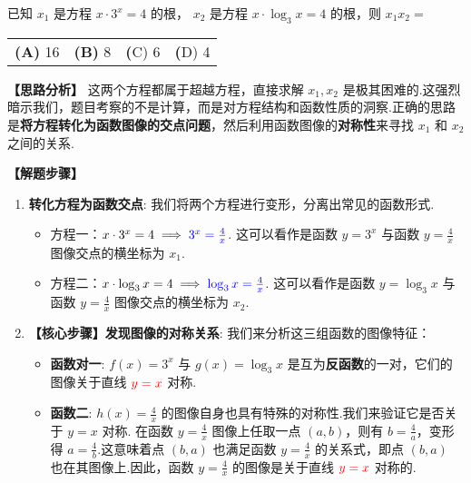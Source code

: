\begin{exercise}[利用对称性求解方程根的关系]
	已知 $x_1$ 是方程 $x \cdot 3^x = 4$ 的根， $x_2$ 是方程 $x \cdot \log_3 x = 4$ 的根，则 $x_1 x_2 =$
	
	\vspace{0.5em}
	\noindent 
	\begin{tabularx}{\linewidth}{*{4}{X}}
		\textbf{(A)} 16 & \textbf{(B)} 8 & \textbf(C) 6 & \textbf(D) 4
	\end{tabularx}
	
\end{exercise}
\begin{solution}
	\textbf{【思路分析】}
	\textcolor{green!50!black}{这两个方程都属于超越方程，直接求解 $x_1, x_2$ 是极其困难的.这强烈暗示我们，题目考察的不是计算，而是对方程结构和函数性质的洞察.正确的思路是\textbf{将方程转化为函数图像的交点问题}，然后利用函数图像的\textbf{对称性}来寻找 $x_1$ 和 $x_2$ 之间的关系.}
	
	\textbf{【解题步骤】}
	\begin{enumerate}
		\item \textbf{转化方程为函数交点}:
		我们将两个方程进行变形，分离出常见的函数形式.
		\begin{itemize}
			\item 方程一：$x \cdot 3^x = 4 \implies \textcolor{blue}{3^x = \frac{4}{x}}$.
			这可以看作是函数 $y=3^x$ 与函数 $y=\frac{4}{x}$ 图像交点的横坐标为 $x_1$.
			\item 方程二：$x \cdot \log_3 x = 4 \implies \textcolor{blue}{\log_3 x = \frac{4}{x}}$.
			这可以看作是函数 $y=\log_3 x$ 与函数 $y=\frac{4}{x}$ 图像交点的横坐标为 $x_2$.
		\end{itemize}
		
		\item \textbf{【核心步骤】发现图像的对称关系}:
		我们来分析这三组函数的图像特征：
		\begin{itemize}
			\item \textbf{函数对一}: $f(x)=3^x$ 与 $g(x)=\log_3 x$ 是互为\textbf{反函数}的一对，它们的图像关于直线 $\textcolor{red}{y=x}$ 对称.
			\item \textbf{函数二}: $h(x)=\frac{4}{x}$ 的图像自身也具有特殊的对称性.我们来验证它是否关于 $y=x$ 对称.
			在函数 $y=\frac{4}{x}$ 图像上任取一点 $(a,b)$，则有 $b = \frac{4}{a}$，变形得 $a = \frac{4}{b}$.这意味着点 $(b,a)$ 也满足函数 $y=\frac{4}{x}$ 的关系式，即点 $(b,a)$ 也在其图像上.因此，函数 $y=\frac{4}{x}$ 的图像是关于直线 $\textcolor{red}{y=x}$ 对称的.
		\end{itemize}
		

\end{enumerate}
\end{solution}
